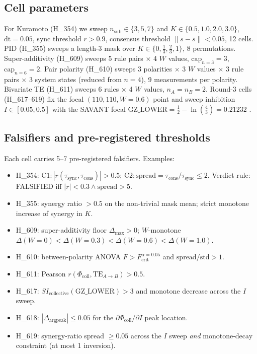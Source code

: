 \documentclass[11pt,a4paper]{article}
\begin{document}
\subsection{Cell parameters}

For Kuramoto (H\_354) we sweep $n_{\mathrm{sub}} \in \{3,5,7\}$ and
$K \in \{0.5, 1.0, 2.0, 3.0\}$, $\mathrm{dt}=0.05$, sync threshold
$r > 0.9$, consensus threshold $\|s - \bar s\| < 0.05$, 12 cells.
PID (H\_355) sweeps a length-3 mask over $K \in \{0,
\tfrac{1}{3}, \tfrac{2}{3}, 1\}$, 8 permutations.
Super-additivity (H\_609) sweeps 5 rule pairs $\times$ 4 $W$
values, $\mathrm{cap}_{n=3}=3$, $\mathrm{cap}_{n=6}=2$.
Pair polarity (H\_610) sweeps 3 polarities $\times$ 3 $W$ values
$\times$ 3 rule pairs $\times$ 3 system states (reduced from $n=4$),
9 measurements per polarity. Bivariate TE (H\_611) sweeps 6 rules
$\times$ 4 $W$ values, $n_A = n_B = 2$. Round-3 cells (H\_617--619)
fix the focal $(110, 110, W{=}0.6)$ point and sweep inhibition
$I \in [0.05, 0.5]$ with the SAVANT focal $\mathrm{GZ\_LOWER}
= \tfrac{1}{2} - \ln(\tfrac{4}{3}) = 0.21232$
\citep{anima_H348}.

\subsection{Falsifiers and pre-registered thresholds}

Each cell carries 5--7 pre-registered falsifiers. Examples:
\begin{itemize}\itemsep0.2em
\item H\_354: $\mathrm{C1}: |r(\tau_{\mathrm{sync}},
      \tau_{\mathrm{cons}})| > 0.5$;
      $\mathrm{C2}: \mathrm{spread} = \tau_{\mathrm{cons}}/\tau_{\mathrm{sync}}
      \leq 2$.
      Verdict rule: FALSIFIED iff $|r| < 0.3 \wedge \mathrm{spread} > 5$.
\item H\_355: synergy ratio $> 0.5$ on the non-trivial mask mean;
      strict monotone increase of synergy in $K$.
\item H\_609: super-additivity floor $\Delta_{\max} > 0$;
      $W$-monotone $\Delta(W=0) < \Delta(W=0.3) < \Delta(W=0.6) < \Delta(W=1.0)$.
\item H\_610: between-polarity ANOVA $F > F_{\mathrm{crit}}^{\alpha=0.05}$ and
      $\mathrm{spread}/\mathrm{std} > 1$.
\item H\_611: Pearson $r(\Phi_{\mathrm{coll}}, \mathrm{TE}_{A\to B}) > 0.5$.
\item H\_617: $SI_{\mathrm{collective}}(\mathrm{GZ\_LOWER}) > 3$ and
      monotone decrease across the $I$ sweep.
\item H\_618: $|\Delta_{\mathrm{argpeak}}| \leq 0.05$ for the
      $\partial\Phi_{\mathrm{coll}}/\partial I$ peak location.
\item H\_619: synergy-ratio spread $\geq 0.05$ across the $I$ sweep
      \emph{and} monotone-decay constraint (at most 1 inversion).
\end{itemize}
\end{document}
